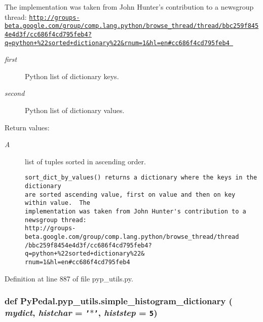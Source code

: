 The implementation was taken from John Hunter's contribution to a newsgroup thread: \href{http://groups-beta.google.com/group/comp.lang.python/browse_thread/thread/bbc259f8454e4d3f/cc686f4cd795feb4?q=python+%22sorted+dictionary%22&rnum=1&hl=en#cc686f4cd795feb4}\tt{http://groups-beta.google.com/group/comp.lang.python/browse\_\-thread/thread/bbc259f8454e4d3f/cc686f4cd795feb4?q=python+\%22sorted+dictionary\%22\&rnum=1\&hl=en\#cc686f4cd795feb4} \begin{Desc}
\item[Parameters:]
\begin{description}
\item[{\em first}]Python list of dictionary keys. \item[{\em second}]Python list of dictionary values. \end{description}
\end{Desc}
\begin{Desc}
\item[Return values:]
\begin{description}
\item[{\em A}]list of tuples sorted in ascending order.

\footnotesize\begin{verbatim}sort_dict_by_values() returns a dictionary where the keys in the dictionary
are sorted ascending value, first on value and then on key within value.  The
implementation was taken from John Hunter's contribution to a newsgroup thread:
http://groups-beta.google.com/group/comp.lang.python/browse_thread/thread
/bbc259f8454e4d3f/cc686f4cd795feb4?q=python+%22sorted+dictionary%22&
rnum=1&hl=en#cc686f4cd795feb4
\end{verbatim}
\normalsize
 \end{description}
\end{Desc}


Definition at line 887 of file pyp\_\-utils.py.\hypertarget{namespacePyPedal_1_1pyp__utils_05fa91a1849789836163518b5089150a}{
\subsubsection[simple\_\-histogram\_\-dictionary]{\setlength{\rightskip}{0pt plus 5cm}def Py\-Pedal.pyp\_\-utils.simple\_\-histogram\_\-dictionary ( {\em mydict},  {\em histchar} = {\tt '$\ast$'},  {\em histstep} = {\tt 5})}}
\label{namespacePyPedal_1_1pyp__utils_05fa91a1849789836163518b5089150a}


